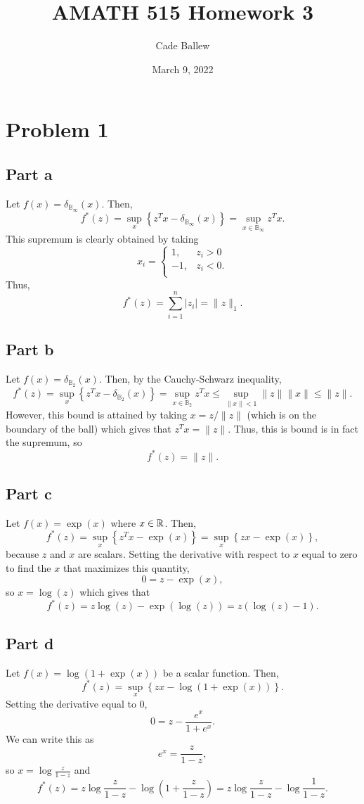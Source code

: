 \documentclass{article}
\title{AMATH 515 Homework 3}
\author{Cade Ballew}
\date{March 9, 2022}
\begin{document}
	
\maketitle
	
\section{Problem 1}
\subsection{Part a}
Let $f(x) = \delta_{\mathbb{B}_{\infty}}(x)$. Then, 
\[
f^*(z)=\sup_x \left\{ z^Tx - \delta_{\mathbb{B}_{\infty}}(x)\right\}=\sup_{x\in\mathbb{B}_{\infty}}z^Tx.
\]
This supremum is clearly obtained by taking
\[
x_i=\begin{cases}
1, &z_i>0\\
-1, &z_i<0.\\\end{cases}
\]
Thus, 
\[
f^*(z)=\sum_{i=1}^n|z_i|=\|z\|_1.
\]

\subsection{Part b}
Let $f(x) = \delta_{\mathbb{B}_2}(x)$. Then, by the Cauchy-Schwarz inequality,
\[
f^*(z)=\sup_x \left\{ z^Tx - \delta_{\mathbb{B}_{2}}(x)\right\}=\sup_{x\in\mathbb{B}_{2}}z^Tx\leq\sup_{\|x\|<1}\|z\|\|x\|\leq\|z\|.
\]
However, this bound is attained by taking $x=z/\|z\|$ (which is on the boundary of the ball) which gives that $z^Tx=\|z\|$. Thus, this is bound is in fact the supremum, so 
\[
f^*(z)=\|z\|.
\]

\subsection{Part c}
Let $f(x)=\exp(x)$ where $x\in\mathbb{R}$. Then,
\[
f^*(z)=\sup_x \left\{ z^Tx - \exp(x)\right\}=\sup_x \left\{ zx - \exp(x)\right\},
\]
because $z$ and $x$ are scalars. Setting the derivative with respect to $x$ equal to zero to find the $x$ that maximizes this quantity,
\[
0=z-\exp(x),
\]
so $x=\log(z)$ which gives that 
\[
f^*(z)=z\log(z)-\exp(\log(z))=z(\log(z)-1).
\]

\subsection{Part d}
Let $f(x) =  \log(1+\exp(x))$ be a scalar function. Then,
\[
f^*(z)=\sup_x \left\{ zx - \log(1+\exp(x))\right\}.
\]
Setting the derivative equal to 0,
\[
0=z-\frac{e^x}{1+e^x}.
\]
We can write this as 
\[
e^x=\frac{z}{1-z},
\]
so $x=\log{\frac{z}{1-z}}$ and 
\[
f^*(z)=z\log{\frac{z}{1-z}}-\log\left(1+\frac{z}{1-z}\right)=z\log\frac{z}{1-z}-\log\frac{1}{1-z}.
\]
\end{document}
